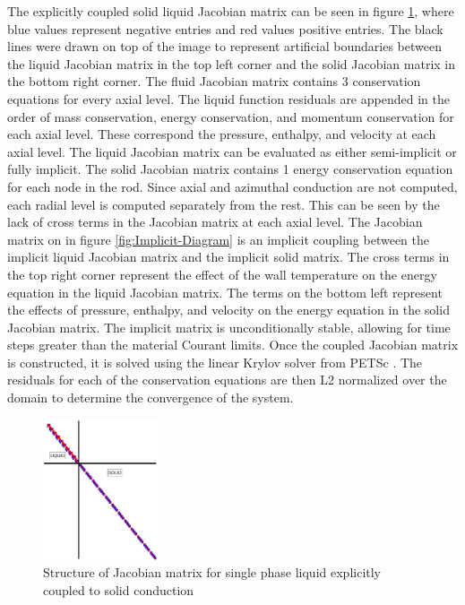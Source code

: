 	The explicitly coupled solid liquid Jacobian matrix can be seen in figure
	\ref{fig:Explicit-Diagram}, where blue values represent negative entries and
	red values positive entries. The black lines were drawn on top of the image to
	represent artificial boundaries between the liquid Jacobian matrix in the top
	left corner and the solid Jacobian matrix in the bottom right corner. The fluid
	Jacobian matrix contains 3 conservation equations for every axial level. The
	liquid function residuals are appended in the order of mass conservation,
	energy conservation, and momentum conservation for each axial level. These
	correspond the pressure, enthalpy, and velocity at each axial level. The liquid
	Jacobian matrix can be evaluated as either semi-implicit or fully implicit. The
	solid Jacobian matrix contains 1 energy conservation equation for each node in
	the rod. Since axial and azimuthal conduction are not computed, each radial
	level is computed separately from the rest. This can be seen by the lack of
	cross terms in the Jacobian matrix at each axial level. The Jacobian matrix on
	in figure \ref{fig:Implicit-Diagram} is an implicit coupling between the
	implicit liquid Jacobian matrix and the implicit solid matrix. The cross terms
	in the top right corner represent the effect of the wall temperature on the
	energy equation in the liquid Jacobian matrix. The terms on the bottom left
	represent the effects of pressure, enthalpy, and velocity on the energy
	equation in the solid Jacobian matrix. The implicit matrix is unconditionally
	stable, allowing for time steps greater than the material Courant limits. Once
	the coupled Jacobian matrix is constructed, it is solved using the linear
	Krylov solver \cite{kelly2003} from PETSc \cite{PETSc}. The residuals for each
	of the conservation equations are then L2 normalized over the domain to
	determine the convergence of the system.
	
	\begin{figure}[!h]
    	\centering
    	\includegraphics[width=0.30\textwidth]{images/Explicit-Diagram.jpg}
    	\caption{Structure of Jacobian matrix for single phase liquid
    	explicitly coupled to solid conduction}
    	\label{fig:Explicit-Diagram}
    \end{figure}
    
